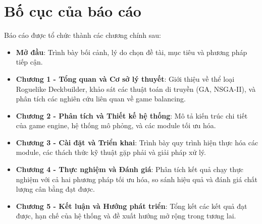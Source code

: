 \section{Bố cục của báo cáo}
Báo cáo được tổ chức thành các chương chính sau:
\begin{itemize}
    \item \textbf{Mở đầu}: Trình bày bối cảnh, lý do chọn đề tài, mục tiêu và phương pháp tiếp cận.
    \item \textbf{Chương 1 - Tổng quan và Cơ sở lý thuyết}: Giới thiệu về thể loại Roguelike Deckbuilder, khảo sát các thuật toán di truyền (GA, NSGA-II), và phân tích các nghiên cứu liên quan về game balancing.
    \item \textbf{Chương 2 - Phân tích và Thiết kế hệ thống}: Mô tả kiến trúc chi tiết của game engine, hệ thống mô phỏng, và các module tối ưu hóa.
    \item \textbf{Chương 3 - Cài đặt và Triển khai}: Trình bày quy trình hiện thực hóa các module, các thách thức kỹ thuật gặp phải và giải pháp xử lý.
    \item \textbf{Chương 4 - Thực nghiệm và Đánh giá}: Phân tích kết quả chạy thực nghiệm với cả hai phương pháp tối ưu hóa, so sánh hiệu quả và đánh giá chất lượng cân bằng đạt được.
    \item \textbf{Chương 5 - Kết luận và Hướng phát triển}: Tổng kết các kết quả đạt được, hạn chế của hệ thống và đề xuất hướng mở rộng trong tương lai.
\end{itemize}
